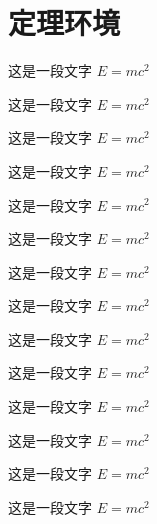 \documentclass{ctexart}
\begin{document}
\section{定理环境}

\begin{definition}
  这是一段文字 $E = m c^2$
\end{definition}

\begin{theorem}
  这是一段文字 $E = m c^2$
\end{theorem}

\begin{example}
  这是一段文字 $E = m c^2$
\end{example}

\begin{property}
  这是一段文字 $E = m c^2$
\end{property}

\begin{proposition}
  这是一段文字 $E = m c^2$
\end{proposition}

\begin{corollary}
  这是一段文字 $E = m c^2$
\end{corollary}

\begin{lemma}
  这是一段文字 $E = m c^2$
\end{lemma}

\begin{axiom}
  这是一段文字 $E = m c^2$
\end{axiom}

\begin{antiexample}
  这是一段文字 $E = m c^2$
\end{antiexample}

\begin{conjecture}
  这是一段文字 $E = m c^2$
\end{conjecture}

\begin{question}
  这是一段文字 $E = m c^2$
\end{question}

\begin{remark}
  这是一段文字 $E = m c^2$
\end{remark}

\begin{hint}
  这是一段文字 $E = m c^2$
\end{hint}

\begin{summary}
  这是一段文字 $E = m c^2$
\end{summary}
\end{document}
